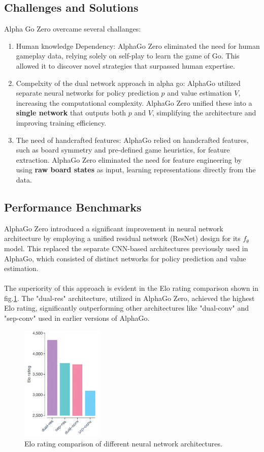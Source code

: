 \subsection{Challenges and Solutions}
Alpha Go Zero overcame several challanges:
\begin{enumerate}
    \item Human knowledge Dependency: AlphaGo Zero eliminated the need for human gameplay
          data, relying solely on self-play to learn the game of Go. This allowed it to
          discover novel strategies that surpassed human expertise.
    \item Compelxity of the dual network approach in alpha go: AlphaGo utilized separate
          neural networks for policy prediction $p$ and value estimation $V$, increasing
          the computational complexity. AlphaGo Zero unified these into a \textbf{single
              network} that outputs both $p$ and $V$, simplifying the architecture and
          improving training efficiency.
    \item The need of handcrafted features: AlphaGo relied on handcrafted features, such
          as board symmetry and pre-defined game heuristics, for feature extraction.
          AlphaGo Zero eliminated the need for feature engineering by using \textbf{raw
              board states} as input, learning representations directly from the data.
\end{enumerate}

\subsection{Performance Benchmarks}

AlphaGo Zero introduced a significant improvement in neural network
architecture by employing a unified residual network (ResNet) design for its
$f_\theta$ model. This replaced the separate CNN-based architectures previously
used in AlphaGo, which consisted of distinct networks for policy prediction and
value estimation. \\\\ The superiority of this approach is evident in the Elo
rating comparison shown in fig.\ref{fig:results_agz}. The "dual-res"
architecture, utilized in AlphaGo Zero, achieved the highest Elo rating,
significantly outperforming other architectures like "dual-conv" and "sep-conv"
used in earlier versions of AlphaGo.

\begin{figure}[ht]
    \centering
    \includegraphics[width=0.35\textwidth]{sections/5AlphaGo Zero/Results_agz.png}
    \caption{Elo rating comparison of different neural network architectures.}
    \label{fig:results_agz}
\end{figure}

